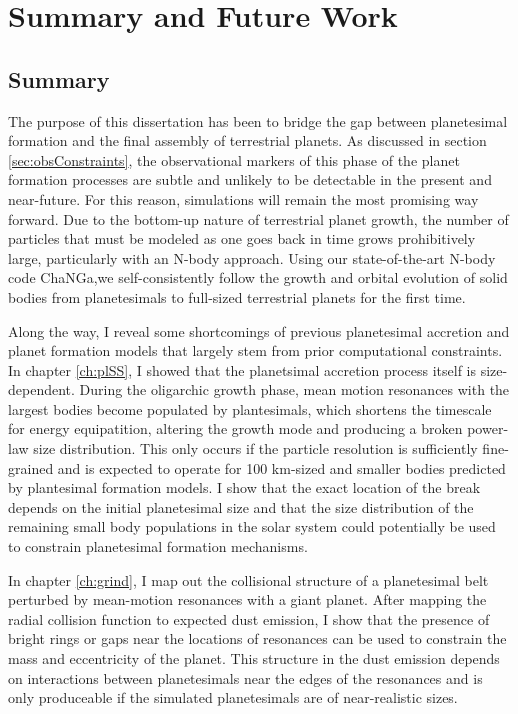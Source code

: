 \chapter {Summary and Future Work}


\section{Summary}
The purpose of this dissertation has been to bridge the gap between planetesimal formation and the final assembly of terrestrial planets. As discussed in section \ref{sec:obsConstraints}, the observational markers of this phase of the planet formation processes are subtle and unlikely to be detectable in the present and near-future. For this reason, simulations will remain the most promising way forward. Due to the bottom-up nature of terrestrial planet growth, the number of particles that must be modeled as one goes back in time grows prohibitively large, particularly with an N-body approach. Using our state-of-the-art N-body code {\sc ChaNGa},we self-consistently follow the growth and orbital evolution of solid bodies from planetesimals to full-sized terrestrial planets for the first time.

Along the way, I reveal some shortcomings of previous planetesimal accretion and planet formation models that largely stem from prior computational constraints. In chapter \ref{ch:plSS}, I showed that the planetsimal accretion process itself is size-dependent. During the oligarchic growth phase, mean motion resonances with the largest bodies become populated by plantesimals, which shortens the timescale for energy equipatition, altering the growth mode and producing a broken power-law size distribution. This only occurs if the particle resolution is sufficiently fine-grained and is expected to operate for 100 km-sized and smaller bodies predicted by plantesimal formation models. I show that the exact location of the break depends on the initial planetesimal size and that the size distribution of the remaining small body populations in the solar system could potentially be used to constrain planetesimal formation mechanisms.

In chapter \ref{ch:grind}, I map out the collisional structure of a planetesimal belt perturbed by mean-motion resonances with a giant planet. After mapping the radial collision function to expected dust emission, I show that the presence of bright rings or gaps near the locations of resonances can be used to constrain the mass and eccentricity of the planet. This structure in the dust emission depends on interactions between planetesimals near the edges of the resonances and is only produceable if the simulated planetesimals are of near-realistic sizes.


